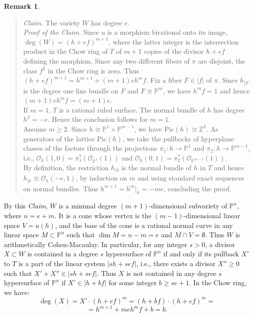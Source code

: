 \documentclass[a4, 11pt]{amsart}
\theoremstyle{plain}
\theoremstyle{definition}
\newtheorem{remark}[theorem]{Remark}
\newcommand{\enm}[1]{\ensuremath{#1}}          %
\newcommand{\cal}[1]{\mathcal{#1}}
\newcommand{\ZZ}{\enm{\mathbb{Z}}}
\newcommand{\PP}{\enm{\mathbb{P}}}
\newcommand{\Oo}{\enm{\cal{O}}}
\renewcommand{\to}[1][]{\xrightarrow{\ #1\ }}
\begin{document}
\begin{remark}
\begin{quote}
{\it Claim.} The variety $W$ has degree $e$. \\
{\it Proof of the Claim.} Since $u$ is a morphism birational onto its image, $\deg (W)= (h+ef)^{m+1}$, where the latter
integer is the intersection product in the Chow ring of $T$ of $m+1$ copies of the divisor $h+ef$ defining the morphism. 
Since any two different fibers of $\pi$ are disjoint, the class $f^2$ in the Chow ring is zero. Thus $(h+ef)^{m+1} = h^{m+1} +(m+1)eh^mf$.
Fix a fiber $F\in |f|$ of $\pi$. Since $h_{|F}$ is the degree one line bundle on $F$ and $F\cong \PP^{m}$, we have $h^{m}f =1$ and
hence $(m+1)eh^{m}f =(m+1)e$. \\
If $m=1$, $T$ is a rational ruled surface. The normal bundle of $h$ has degree $h^2=-e$. Hence the conclusion follows for $m=1$. \\
Assume $m\ge 2$. Since $h \cong \PP^1\times \PP^{m-1}$, we have
$\mathrm{Pic}(h)\cong \ZZ^2$. As generators of the lattice $\mathrm{Pic}(h)$, we take the pullbacks of hyperplane classes of the factors through the projections $\pi _1: h\to \PP^1$ and $\pi _2: h\to \PP^{m-1}$, i.e., $\Oo _h(1,0) = \pi _1^\ast (\Oo_{\PP^1}(1))$ and $\Oo _h(0,1) = \pi _2^\ast (\Oo _{\PP^{m-1}}(1))$. \\
By definition, the restriction $h_{|h}$ is the normal bundle of $h$ in $T$ and hence $h_{|h} \cong
\Oo _h(-e,1)$, by induction on $m$ and using standard exact sequences on normal bundles. Thus $h^{m+1} = h^m|_{h} = -me$, concluding the proof.
\end{quote}

By this {\it Claim}, $W$ is a minimal degree $(m+1)$-dimensional subvariety of $\PP^{n}$, where $n=e+m$. It is a cone whose vertex is the $(m-1)$-dimensional linear space $V= u(h)$, and the base of the cone is a rational normal curve in any linear space $M\subset \PP^n$ such that $\dim M = n-m = e$ and $M\cap V=\emptyset$. Thus $W$ is arithmetically Cohen-Macaulay. In particular, for any integer $s>0$, a divisor $X\subset W$ is contained in a degree $s$ hypersurface of $\PP^n$ if and only if its pullback $X'$ to $T$ is a part of the linear system $|sh+sef|$, i.e., there exists a divisor $X''\ge 0$ such that $X'+X'' \in |sh+sef|$. Thus $X$ is not contained in any degree
$s$ hypersurface of $\PP^n$ if $X'\in |h+bf|$ for some integer $b \geq se+1$. In the Chow ring, we have:
\[\deg (X) =X'\cdot (h+ef)^m = (h+bf)\cdot(h+ef)^m = 
\]
\[
=h^{m+1}+meh^{m}f+b = b.
\]
\end{remark}
\end{document}
